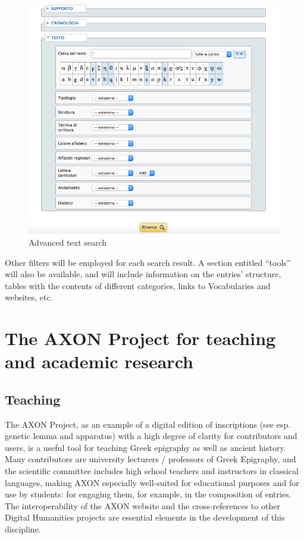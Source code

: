 \documentclass[amsthm,ebook]{saparticle}
\begin{document}
\begin{figure}[!bp]
\centering
 \includegraphics[width=\columnwidth]{EAGLE2016FullPaperrevised-img005.png}
\caption{Advanced text search}
\label{fig:5}
\end{figure}


Other filters will be employed for each search result. A section entitled ``tools'' will also be available, and will
include information on the entries’ structure, tables with the contents of different categories, links to Vocabularies
and websites, etc. 

\section{The AXON Project for teaching and academic research}




\subsection{Teaching}





\noindent The AXON Project, as an example of a digital edition of inscriptions (see esp. genetic lemma and apparatus) with a high
degree of clarity for contributors and users, is a useful tool for teaching Greek epigraphy as well as ancient history.
Many contributors are university lecturers / professors of Greek Epigraphy, and the scientific committee includes high
school teachers and instructors in classical languages, making AXON especially well-suited for educational purposes and
for use by students: for engaging them, for example, in the composition of entries. The interoperability of the AXON
website and the cross-references to other Digital Humanities projects are essential elements in the development of this
discipline. 
\end{document}
